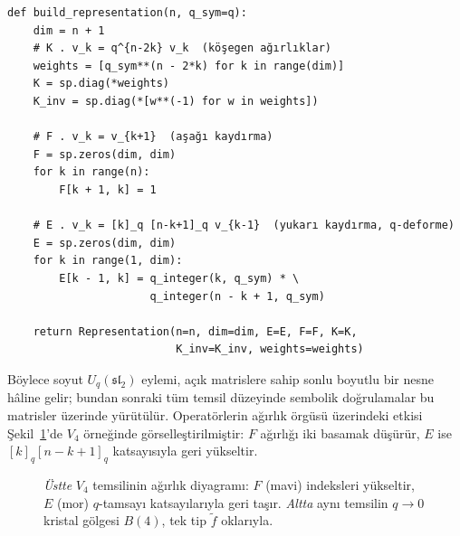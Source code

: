\documentclass[10pt]{math}
\numberwithin{equation}{section}
\theoremstyle{plain}
\theoremstyle{definition}
\renewcommand{\sl}{\mathfrak{sl}}
\newcommand{\Uq}{U_q(\sl_2)}
\newcommand{\qint}[1]{[#1]_q}
\begin{document}
\begin{lstlisting}[style=pyblock,caption={$V_n$ temsilinde $E,F,K,K^{-1}$ matrislerinin inşası}]
def build_representation(n, q_sym=q):
    dim = n + 1
    # K . v_k = q^{n-2k} v_k  (köşegen ağırlıklar)
    weights = [q_sym**(n - 2*k) for k in range(dim)]
    K = sp.diag(*weights)
    K_inv = sp.diag(*[w**(-1) for w in weights])

    # F . v_k = v_{k+1}  (aşağı kaydırma)
    F = sp.zeros(dim, dim)
    for k in range(n):
        F[k + 1, k] = 1

    # E . v_k = [k]_q [n-k+1]_q v_{k-1}  (yukarı kaydırma, q-deforme)
    E = sp.zeros(dim, dim)
    for k in range(1, dim):
        E[k - 1, k] = q_integer(k, q_sym) * \
                      q_integer(n - k + 1, q_sym)

    return Representation(n=n, dim=dim, E=E, F=F, K=K,
                          K_inv=K_inv, weights=weights)
\end{lstlisting}

Böylece soyut $\Uq$ eylemi, açık matrislere sahip sonlu boyutlu bir nesne
hâline gelir; bundan sonraki tüm temsil düzeyinde sembolik doğrulamalar bu
matrisler üzerinde yürütülür. Operatörlerin ağırlık örgüsü üzerindeki etkisi
Şekil~\ref{fig:weight}'de $V_4$ örneğinde görselleştirilmiştir: $F$ ağırlığı iki
basamak düşürür, $E$ ise $\qint{k}\qint{n-k+1}$ katsayısıyla geri yükseltir.

\begin{figure}[h]
\centering
{}
\caption{\emph{Üstte} $V_4$ temsilinin ağırlık diyagramı: $F$ (mavi) indeksleri
yükseltir, $E$ (mor) $q$-tamsayı katsayılarıyla geri taşır. \emph{Altta} aynı
temsilin $q\to 0$ kristal gölgesi $B(4)$, tek tip $\tilde f$ oklarıyla.}
\label{fig:weight}
\end{figure}
\end{document}
